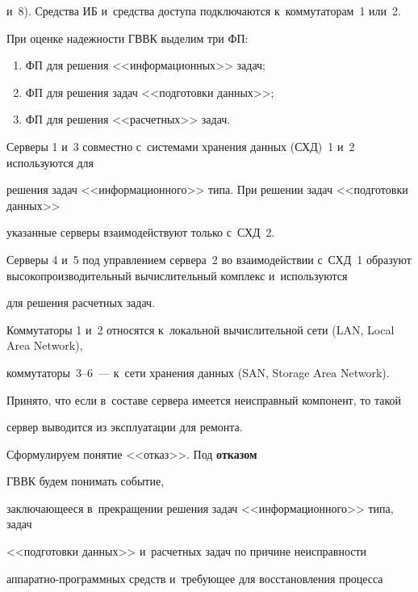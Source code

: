 и~8). Средства ИБ и~средства доступа подключаются к~коммутаторам~1 или~2. 

      

      При оценке надежности ГВВК выделим три ФП: 

      \begin{enumerate}[(1)]

      \item ФП для решения <<информационных>> задач;

      \item ФП для решения задач <<подготовки данных>>;

      \item  ФП для решения <<расчетных>> задач.

      \end{enumerate}

      

      Серверы 1 и~3 совместно с~системами хранения данных (СХД)~1 и~2 используются для 

решения задач <<информационного>> типа. При решении задач <<подготовки данных>> 

указанные серверы взаимодействуют только с~СХД~2.

      

      Серверы 4 и~5 под управлением сервера~2 во взаимодействии с~СХД~1 образуют высокопроизводительный вычислительный комплекс и~используются 

для решения расчетных задач.

      

      Коммутаторы 1 и~2 относятся к~локальной вычислительной сети (LAN, Local Area Network), 

коммутаторы~3--6~--- к~сети хранения данных (SAN, Storage Area Network).

      

      Принято, что если в~составе сервера имеется неисправный компонент, то такой 

сервер выводится из эксплуатации для ремонта.

      

      Сформулируем понятие <<отказ>>. Под \textbf{отказом} 

ГВВК будем понимать событие, 

заключающееся в~прекращении решения задач <<информационного>> типа, задач 

<<подготовки данных>> и~расчетных задач по причине неисправности  

ап\-па\-рат\-но-про\-грам\-мных средств и~требующее для восстановления процесса 


